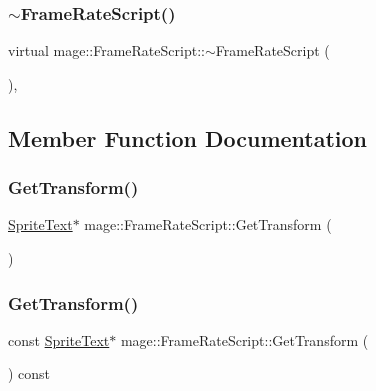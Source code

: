 \subsubsection{\texorpdfstring{$\sim$\+Frame\+Rate\+Script()}{~FrameRateScript()}}
{\footnotesize\ttfamily virtual mage\+::\+Frame\+Rate\+Script\+::$\sim$\+Frame\+Rate\+Script (\begin{DoxyParamCaption}{ }\end{DoxyParamCaption})\hspace{0.3cm}{\ttfamily [virtual]}, {\ttfamily [default]}}



\subsection{Member Function Documentation}
\hypertarget{classmage_1_1_frame_rate_script_a23f833cb5a8b78fb38a47ac0db2305a8}{}\label{classmage_1_1_frame_rate_script_a23f833cb5a8b78fb38a47ac0db2305a8} 
\subsubsection{\texorpdfstring{Get\+Transform()}{GetTransform()}\hspace{0.1cm}{\footnotesize\ttfamily [1/2]}}
{\footnotesize\ttfamily \hyperlink{classmage_1_1_sprite_text}{Sprite\+Text}$\ast$ mage\+::\+Frame\+Rate\+Script\+::\+Get\+Transform (\begin{DoxyParamCaption}{ }\end{DoxyParamCaption})}

\hypertarget{classmage_1_1_frame_rate_script_ab257acb42811f46fcb2aa90781dcdc28}{}\label{classmage_1_1_frame_rate_script_ab257acb42811f46fcb2aa90781dcdc28} 
\subsubsection{\texorpdfstring{Get\+Transform()}{GetTransform()}\hspace{0.1cm}{\footnotesize\ttfamily [2/2]}}
{\footnotesize\ttfamily const \hyperlink{classmage_1_1_sprite_text}{Sprite\+Text}$\ast$ mage\+::\+Frame\+Rate\+Script\+::\+Get\+Transform (\begin{DoxyParamCaption}{ }\end{DoxyParamCaption}) const}

